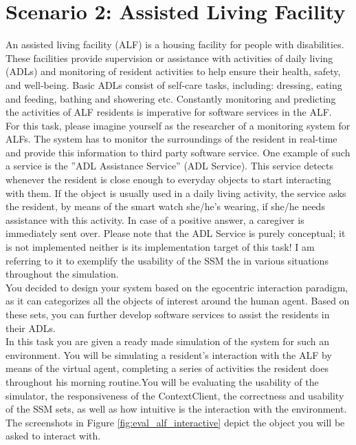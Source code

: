 \section{Scenario 2: Assisted Living Facility} %
\label{sec:eval_alf_scenario}
An assisted living facility (ALF) is a housing facility for people with disabilities. These facilities provide supervision or assistance with activities of daily living (ADLs) and monitoring of resident activities to help ensure their health, safety, and well-being. Basic ADLs consist of self-care tasks, including: dressing, eating and feeding, bathing and showering etc. Constantly monitoring and predicting the activities of ALF residents is imperative for software services in the ALF.\\

For this task, please imagine yourself as the researcher of a monitoring system for ALFs. The system has to monitor the surroundings of the resident in real-time and provide this information to third party software service. One example of such a service is the ''ADL Assistance Service'' (ADL Service). This service detects whenever the resident is close enough to everyday objects to start interacting with them. If the object is usually used in a daily living activity, the service asks the resident, by means of the smart watch she/he's wearing, if she/he needs assistance with this activity. In case of a positive answer, a caregiver is immediately sent over. Please note that the ADL Service is purely conceptual; it is not implemented neither is its implementation target of this task! I am referring to it to exemplify the usability of the SSM the in various situations throughout the simulation.\\

You decided to design your system based on the egocentric interaction paradigm, as it can categorizes all the objects of interest around the human agent. Based on these sets, you can further develop software services to assist the residents in their ADLs.\\

In this task you are given a ready made simulation of the system for such an environment. You will be simulating a resident's interaction with the ALF by means of the virtual agent, completing a series of activities the resident does throughout his morning routine.You will be evaluating the usability of the simulator, the responsiveness of the ContextClient, the correctness and usability of the SSM sets, as well as how intuitive is the interaction with the environment. The screenshots in Figure \ref{fig:eval_alf_interactive} depict the object you will be asked to interact with.\\

